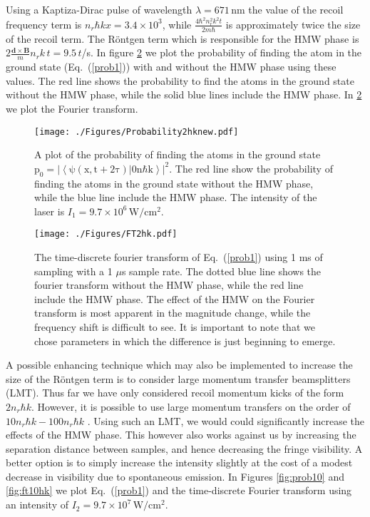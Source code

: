 Using a Kaptiza-Dirac pulse of wavelength $\lambda=671\,\mathrm{nm}$ the value of the recoil frequency term is $n_r\hbar kx =3.4\times 10^3$, while $\frac{4\hbar^2n_r^2k^2t}{2m\hbar}$ is approximately twice the size of the recoil term. The R\"{o}ntgen term which is responsible for the HMW phase is  $2\frac{\mathbf{d}\times\mathbf{B}}{m}n_rk\,t=9.5\,t$/s.  
In figure \ref{fig:ft2hk} we plot the probability of finding the atom in the ground state (Eq.\ (\ref{prob1})) with and without the HMW phase using these values. The red line shows the probability to find the atoms in the ground state without the HMW phase, while the solid blue lines include the HMW phase. In \ref{fig:ft2hk} we plot the Fourier transform.  
\begin{figure}[htp]
\texttt{[image: ./Figures/Probability2hknew.pdf]}
\caption{A plot of the probability of finding the atoms in the ground state $\mathrm{p_0=|\left<\psi(x,t+2\tau)|0n\hbar k\right>|^2}$. The red line show the probability of finding the atoms in the ground state without the HMW phase, while the blue line include the HMW phase. The intensity of the laser is $I_1=9.7\times 10^6\, \mathrm{W/cm^2}$.} 
\label{fig:prob}
\end{figure}
\begin{figure}[htp]
\texttt{[image: ./Figures/FT2hk.pdf]}
\caption{The time-discrete fourier transform of Eq.\ (\ref{prob1}) using 1 ms of sampling with a 1 $\mu$s sample rate. The dotted blue line shows the fourier transform without the HMW phase, while the red line include the HMW phase. The effect of the HMW on the Fourier transform is most apparent in the magnitude change, while the frequency shift is difficult to see. It is important to note that we chose parameters in which the difference is just beginning to emerge.} 
\label{fig:ft2hk}
\end{figure}


A possible enhancing technique which may also be implemented to increase the size of the R\"{o}ntgen term is to consider large momentum transfer beamsplitters (LMT). Thus far we have only considered recoil momentum kicks of the form $2n_r\hbar k$. However, it is possible to use large momentum transfers on the order of $10 n_r\hbar k-100 n_r\hbar k$ \cite{kasevich}.  Using such an LMT, we would could significantly increase the effects of the HMW phase.  This however also works against us by increasing the separation distance between samples, and hence decreasing the fringe visibility.  A better option is to simply increase the intensity slightly at the cost of a modest decrease in visibility due to spontaneous emission.  In Figures \ref{fig:prob10} and \ref{fig:ft10hk} we plot Eq.\ (\ref{prob1}) and the time-discrete Fourier transform using an intensity of $I_2=9.7\times 10^7\, \mathrm{W/cm^2}$.

